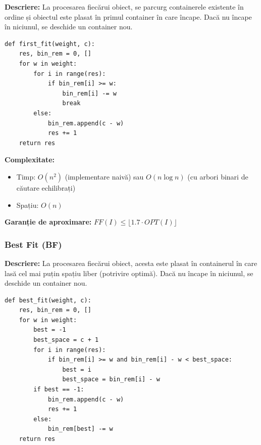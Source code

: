 \documentclass[runningheads]{llncs}
\begin{document}
\textbf{Descriere:} La procesarea fiecărui obiect, se parcurg containerele existente în ordine și obiectul este plasat în primul container în care încape. Dacă nu încape în niciunul, se deschide un container nou.

\begin{tcolorbox}[BoxOrange, title=\faIcon{code} Implementare First Fit (Python), fonttitle=\bfseries]
\begin{lstlisting}
def first_fit(weight, c):
    res, bin_rem = 0, []
    for w in weight:
        for i in range(res):
            if bin_rem[i] >= w:
                bin_rem[i] -= w
                break
        else:
            bin_rem.append(c - w)
            res += 1
    return res
\end{lstlisting}
\end{tcolorbox}

\textbf{Complexitate:}
\begin{itemize}
    \item Timp: $O(n^2)$ (implementare naivă) sau $O(n \log n)$ (cu arbori binari de căutare echilibrați)
    \item Spațiu: $O(n)$
\end{itemize}

\textbf{Garanție de aproximare:} $FF(I) \leq \lfloor 1.7 \cdot OPT(I) \rfloor$ \cite{dosa2007tight}

\subsubsection{Best Fit (BF)}

\textbf{Descriere:} La procesarea fiecărui obiect, acesta este plasat în containerul în care lasă cel mai puțin spațiu liber (potrivire optimă). Dacă nu încape în niciunul, se deschide un container nou.

\begin{tcolorbox}[BoxGreen, title=\faIcon{code} Implementare Best Fit (Python), fonttitle=\bfseries]
\begin{lstlisting}
def best_fit(weight, c):
    res, bin_rem = 0, []
    for w in weight:
        best = -1
        best_space = c + 1
        for i in range(res):
            if bin_rem[i] >= w and bin_rem[i] - w < best_space:
                best = i
                best_space = bin_rem[i] - w
        if best == -1:
            bin_rem.append(c - w)
            res += 1
        else:
            bin_rem[best] -= w
    return res
\end{lstlisting}
\end{tcolorbox}
\end{document}
